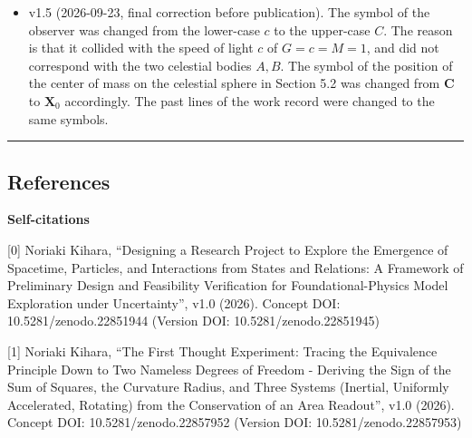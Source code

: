 \documentclass[
  a4paper,
]{article}
\begin{document}
\begin{itemize}
  reorganized as the additional relational information of Section 8.2 of
  {[}2{]} (T21b), and it was restated that the structure of three
  interacting bodies of Section 8.3 is not realized in this paper. The
  two celestial bodies are written \(A, B\) and the values \(a, b\),
  distinctly. What the readout does not use was changed to ``the values
  of \(a, b\) on the generating side and the truth'', and the use of the
  coordinates of the known model was made explicit in Sections 0 and 2.1
  as well. D8 lists the known model and the map of the observation
  (equations of motion, center-of-mass relation, quadrupole waveform,
  rate of proper time), and D9 adds that the celestial coordinate system
  is treated as a fixed inertial reference. P1 was unified with ``at
  least two''.
\item
  v1.5 (2026-09-23, final correction before publication). The symbol of
  the observer was changed from the lower-case \(c\) to the upper-case
  \(C\). The reason is that it collided with the speed of light \(c\) of
  \(G=c=M=1\), and did not correspond with the two celestial bodies
  \(A, B\). The symbol of the position of the center of mass on the
  celestial sphere in Section 5.2 was changed from \(\mathbf C\) to
  \(\mathbf X_0\) accordingly. The past lines of the work record were
  changed to the same symbols.
\end{itemize}

\begin{center}\rule{0.5\linewidth}{0.5pt}\end{center}

\subsection{References}\label{references}

\textbf{Self-citations}

{[}0{]} Noriaki Kihara, ``Designing a Research Project to Explore the
Emergence of Spacetime, Particles, and Interactions from States and
Relations: A Framework of Preliminary Design and Feasibility
Verification for Foundational-Physics Model Exploration under
Uncertainty'', v1.0 (2026). Concept DOI: 10.5281/zenodo.22851944
(Version DOI: 10.5281/zenodo.22851945)

{[}1{]} Noriaki Kihara, ``The First Thought Experiment: Tracing the
Equivalence Principle Down to Two Nameless Degrees of Freedom - Deriving
the Sign of the Sum of Squares, the Curvature Radius, and Three Systems
(Inertial, Uniformly Accelerated, Rotating) from the Conservation of an
Area Readout'', v1.0 (2026). Concept DOI: 10.5281/zenodo.22857952
(Version DOI: 10.5281/zenodo.22857953)
\end{document}
